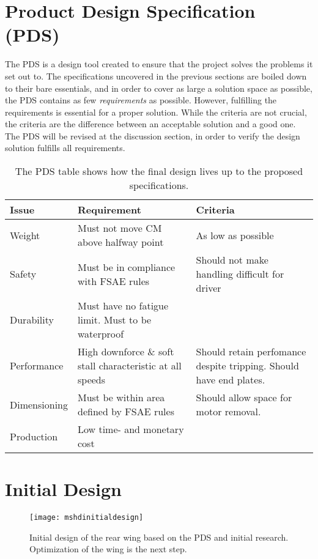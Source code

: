   \section{Product Design Specification (PDS)}
  \label{sec:PDS}

    The PDS is a design tool created to ensure that the project solves the problems it set out to. The specifications uncovered in the previous sections are boiled down to their bare essentials, and in order to cover as large a solution space as possible, the PDS contains as few \emph{requirements} as possible. However, fulfilling the requirements is essential for a proper solution. While the criteria are not crucial, the criteria are the difference between an acceptable solution and a good one. The PDS will be revised at the discussion section, in order to verify the design solution fulfills all requirements.
    \begin{table}
      \begin{tabularx}{\textwidth}[t]{>{\columncolor{seapurple!40}}l XX}
      \arrayrulecolor{seapurple}\hline
      \rowcolor{white}
      \textbf{\textcolor{seapurple}{Issue}} & \textbf{\textcolor{seapurple}{Requirement}} & \textbf{\textcolor{seapurple}{Criteria}}\\
      \hline
      Weight & Must not move CM above halfway point & As low as possible \\
      Safety & Must be in compliance with FSAE rules & Should not make handling difficult for driver\\
      Durability & Must have no fatigue limit. Must to be waterproof & \\
      Performance & High downforce \& soft stall characteristic at all speeds & Should retain perfomance despite tripping. Should have end plates.\\
      Dimensioning & Must be within area defined by FSAE rules & Should allow space for motor removal. \\
      Production & Low time- and monetary cost & \\
      \end{tabularx}
      \caption{The PDS table shows how the final design lives up to the proposed specifications.}
    \end{table}
  \section{Initial Design}

    \begin{figure}
      \texttt{[image: mshdinitialdesign]}
      \caption{Initial design of the rear wing based on the PDS and initial research. Optimization of the wing is the next step.}
      \label{fig:firstdraftwing}
    \end{figure}

